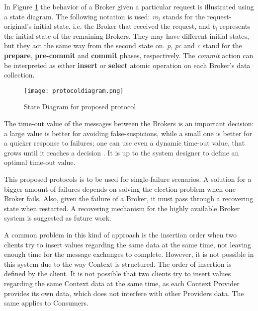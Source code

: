 In Figure \ref{fig:protocoldiagram} the behavior of a Broker given a particular request is illustrated using a state diagram. The following notation is used: \textit{ro$_i$} stands for the request-original's initial state, i.e. the Broker that received the request, and \textit{b$_i$} represents the initial state of the remaining Brokers. They may have different initial states, but they act the same way from the second state on. \textit{p}, \textit{pc} and \textit{c} stand for the \textbf{prepare}, \textbf{pre-commit} and \textbf{commit} phases, respectively. The \textit{commit} action can be interpreted as either \textbf{insert} or \textbf{select} atomic operation on each Broker's data collection.

\begin{figure}
	\centering
	\texttt{[image: protocoldiagram.png]}
	\caption{State Diagram for proposed protocol}
	\label{fig:protocoldiagram}
	
\end{figure}


The time-out value of the messages between the Brokers is an important decision: a large value is better for avoiding false-suspicions, while a small one is better for a quicker response to failures; one can use even a dynamic time-out value, that grows until it reaches a decision \cite{guerraoui2002non}. It is up to the system designer to define an optimal time-out value.

This proposed protocols is to be used for single-failure scenarios. A solution for a bigger amount of failures depends on solving the election problem when one Broker fails. Also, given the failure of a Broker, it must pass through a recovering state when restarted. A recovering mechanism for the highly available Broker system is suggested as future work.


A common problem in this kind of approach is the insertion order when two clients try to insert values regarding the same data at the same time, not leaving enough time for the message exchanges to complete. However, it is not possible in this system due to the way Context is structured. The order of insertion is defined by the client. It is not possible that two clients try to insert values regarding the same Context data at the same time, as each Context Provider provides its own data, which does not interfere with other Providers data. The same applies to Consumers.